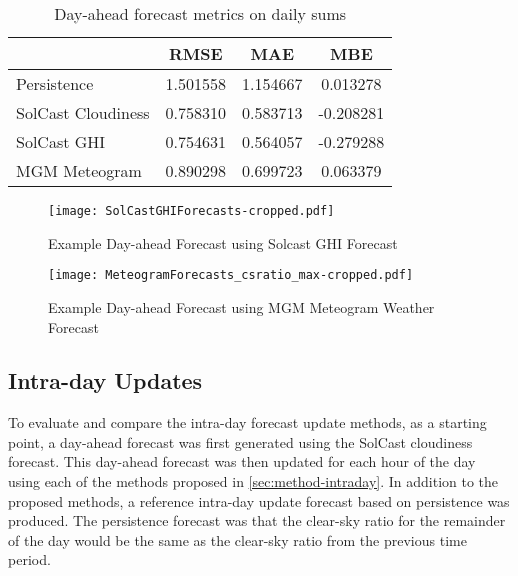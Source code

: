 \begin{table}[tbh]
	\centering
	\caption{Day-ahead forecast metrics on daily sums}
	\label{table:dayahead-metrics-sum}
	\begin{tabular}{lccc}
		\toprule
		                       &   RMSE   &   MAE    &    MBE    \\
        \midrule
		Persistence & 1.501558 & 1.154667 & 0.013278 \\
		SolCast Cloudiness & 0.758310 & 0.583713 & -0.208281 \\
		SolCast GHI & 0.754631 & 0.564057 & -0.279288 \\
		MGM Meteogram & 0.890298 & 0.699723 & 0.063379 \\
		\bottomrule
	\end{tabular}
\end{table}

\begin{figure}[tbh]
	\centering
	\texttt{[image: SolCastGHIForecasts-cropped.pdf]}
	\caption{Example Day-ahead Forecast using Solcast GHI Forecast}
	\label{fig:dayahead-forecast-solcast}
\end{figure}


\begin{figure}[tbh]
	\centering
	\texttt{[image: MeteogramForecasts\_csratio\_max-cropped.pdf]}
	\caption{Example Day-ahead Forecast using MGM Meteogram Weather Forecast}
	\label{fig:dayahead-forecast-meteogram}
\end{figure}


\subsection{Intra-day Updates}

To evaluate and compare the intra-day forecast update methods,
as a starting point, a day-ahead forecast was first generated using the
SolCast cloudiness forecast.
This day-ahead forecast was then updated for each hour of the day using each of the methods proposed in \cref{sec:method-intraday}.
In addition to the proposed methods, a reference intra-day update forecast based on persistence was produced.
The persistence forecast was that the clear-sky ratio for the remainder of the day would be the same as the clear-sky ratio from the previous time period.

